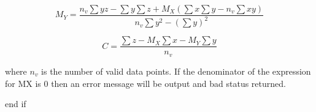 {{\begin{equation}
M_Y = \frac{n_v\sum yz - \sum y \sum z + M_X(\sum x \sum y - n_v\sum xy)}{
                          n_v\sum y^2 - \left(\sum y\right)^2}
\end{equation}


\begin{equation}
C = \frac{\sum z - M_X\sum x - M_Y\sum y}{n_v}
\end{equation}

         where $n_v$ is the number of valid data points. If the denominator of
         the expression for MX is 0 then an error message will be output and
         bad status returned.

      end if
   }
}
